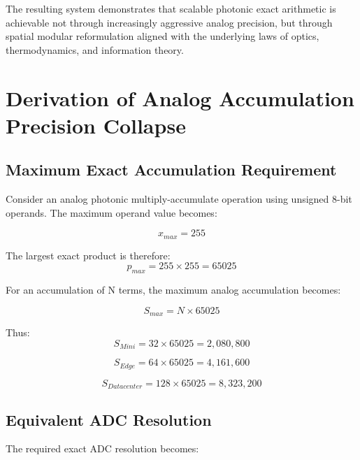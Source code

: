 \documentclass[journal]{IEEEtran}
\begin{document}
The resulting system demonstrates that scalable photonic exact arithmetic is achievable not through increasingly aggressive analog precision, but through spatial modular reformulation aligned with the underlying laws of optics, thermodynamics, and information theory.

\appendices

\section{Derivation of Analog Accumulation Precision Collapse}

\subsection{\textbf{Maximum Exact Accumulation Requirement}}

Consider an analog photonic multiply-accumulate operation using unsigned 8-bit operands. The maximum operand value becomes:

\begin{equation}
x_{max} = 255
\end{equation}

The largest exact product is therefore:
\begin{equation}
p_{max} = 255 \times 255 = 65025
\end{equation}

For an accumulation of N terms, the maximum analog accumulation becomes:

\begin{equation}
S_{max} = N \times 65025
\end{equation}

Thus:
\begin{equation}
S_{Mini} = 32 \times 65025 = 2,080,800 
\end{equation}

\begin{equation}
S_{Edge} = 64 \times 65025 = 4,161,600
\end{equation}

\begin{equation}
S_{Datacenter} = 128 \times 65025 = 8,323,200
\end{equation}

\subsection{\textbf{Equivalent ADC Resolution}}

The required exact ADC resolution becomes:
\end{document}
